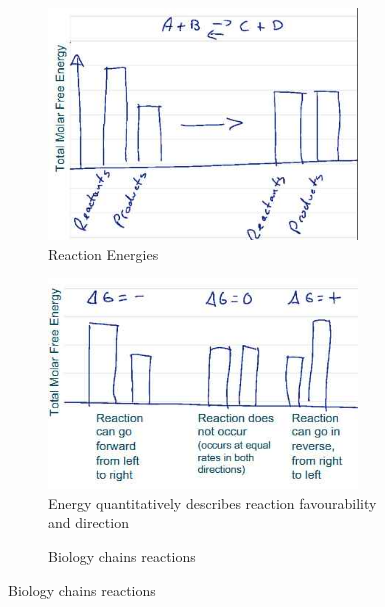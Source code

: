 \documentclass[]{article}
\begin{document}
\begin{figure}[H]
	\begin{subfigure}[t]{0.3\textwidth}
		\caption{Reaction Energies}\label{fig:ReactionEnergies}
		\includegraphics[width=0.9\textwidth]{ReactionEnergies}
	\end{subfigure}
	\begin{subfigure}[t]{0.3\textwidth}
		\caption{Energy quantitatively describes reaction favourability and direction}\label{fig:ReactionEnergies1}
		\includegraphics[width=0.9\textwidth]{ReactionEnergies1}
	\end{subfigure}
	\begin{subfigure}[t]{0.3\textwidth}
		\caption{Biology chains reactions}\label{fig:CoupledReactions}

\end{subfigure}
\end{figure}
\end{document}

